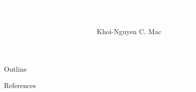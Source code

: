 \documentclass[aspectratio=169]{beamer}
\title[Presentation]{%
    \textcolor{white}{\textbf{Presentation Title}}
}
\author[Mac \etal]{Khoi-Nguyen C. Mac}
\date{}
\begin{document}
    \frame{\titlepage}
	
    \begin{frame}{Outline}
        \tableofcontents
    \end{frame}
	
    
    
    \nocite{item}
    \begin{frame}[t, allowframebreaks]{References}
        \small
        
        
    \end{frame}
\end{document}
